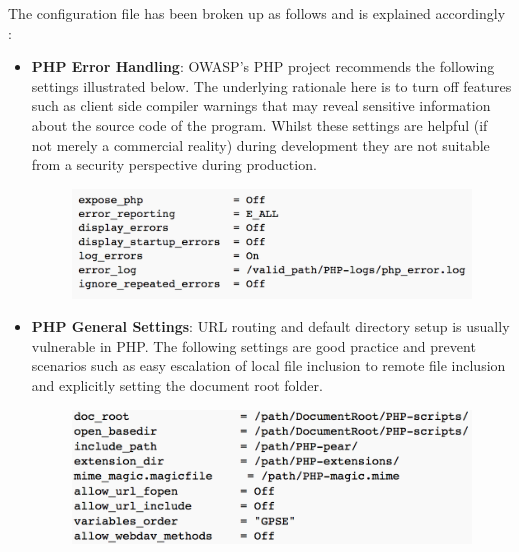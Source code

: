     The configuration file has been broken up as follows and is explained accordingly \cite{OWASPa}:
    \begin{itemize}
        \item \textbf{PHP Error Handling}\cite{OWASPb}: OWASP's PHP project recommends the following settings  illustrated below. The underlying rationale here is to turn off features such as client side compiler warnings that may reveal sensitive information about the source code of the program. Whilst these settings are helpful (if not merely a commercial reality) during development they are not suitable from a security perspective during production.
            \begin{figure}[H]
            	\centering
            	\includegraphics[scale=0.44,center]{chapters/chapter03/figures/errorPHP.png}
            	\label{PHPError}
            \end{figure}   

        \item \textbf{PHP General Settings}\cite{OWASPb}: URL routing and default directory setup is usually vulnerable in PHP. The following settings are good practice and prevent scenarios such as easy escalation of local file inclusion to remote file inclusion and explicitly setting the document root folder.
        
            \begin{figure}[H]
            	\centering
            	\includegraphics[scale=0.44,center]{chapters/chapter03/figures/generalPHP.png}
            	\label{PHPGeneral}
            \end{figure}   
        

\end{itemize}
